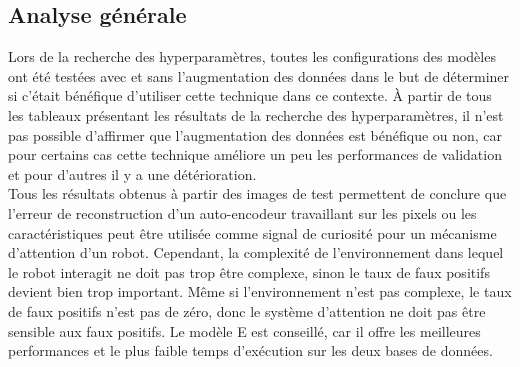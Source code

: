 \subsection{Analyse générale}
    Lors de la recherche des hyperparamètres, toutes les configurations des modèles ont été testées avec et sans l'augmentation des données dans le but de déterminer si c'était bénéfique d'utiliser cette technique dans ce contexte. À partir de tous les tableaux présentant les résultats de la recherche des hyperparamètres, il n'est pas possible d'affirmer que l'augmentation des données est bénéfique ou non, car pour certains cas cette technique améliore un peu les performances de validation et pour d'autres il y a une détérioration.\\
    
    Tous les résultats obtenus à partir des images de test permettent de conclure que l'erreur de reconstruction d'un auto-encodeur travaillant sur les pixels ou les caractéristiques peut être utilisée comme signal de curiosité pour un mécanisme d'attention d'un robot. Cependant, la complexité de l'environnement dans lequel le robot interagit ne doit pas trop être complexe, sinon le taux de faux positifs devient bien trop important. Même si l'environnement n'est pas complexe, le taux de faux positifs n'est pas de zéro, donc le système d'attention ne doit pas être sensible aux faux positifs. Le modèle E est conseillé, car il offre les meilleures performances et le plus faible temps d'exécution sur les deux bases de données.